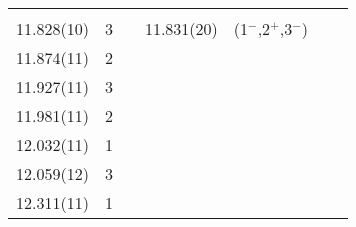 \begin{center}
\begin{longtable}{cc c cc cc}
                &       &                   &                   &                   &                   &                   \\
   11.828(10)   &   3   &                   &     11.831(20)    &(1$^-$,2$^+$,3$^-$)&                   &                   \\
     11.874(11) &   2   &                   &                   &                   &                   &                   \\
    11.927(11)  &   3   &                   &                   &                   &                   &                   \\
    11.981(11)  &   2   &                   &                   &                   &                   &                   \\
     12.032(11) &   1   &                   &                   &                   &                   &                   \\
     12.059(12) &   3   &                   &                   &                   &                   &                   \\
    12.311(11)  &   1   &                   &                   &                   &                   &                   \\


    \end{longtable}
\end{center}
